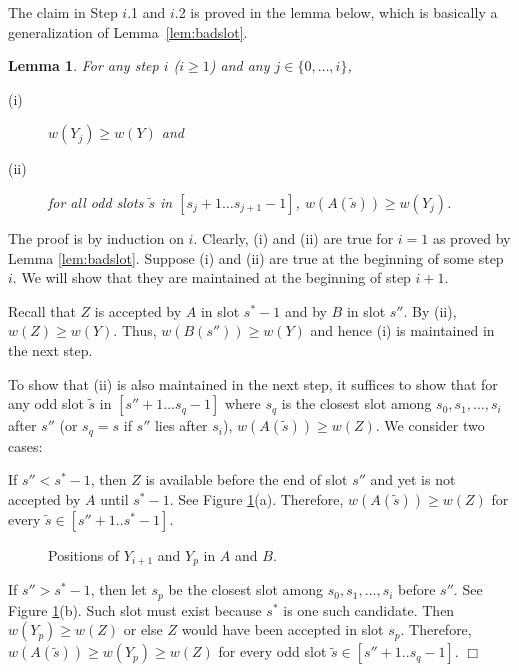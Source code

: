 \documentclass[11pt]{article}
\newtheorem{lemma}{Lemma}[section]
\newcommand{\qed}{\hspace*{\fill}$\Box$\par\medskip}
\newenvironment{proof}{\noindent{\it Proof. }\ignorespaces}{\qed}
\begin{document}
The claim in Step $i$.1 and $i$.2 is proved in the lemma below,
which is basically a generalization of Lemma~\ref{lem:badslot}.

\begin{lemma} \label{lem:A-weights}
For any step $i$ ($i \geq 1$) and any $j \in \{0, \ldots, i\}$, 
\begin{description}
\item[(i)]
$w(Y_j) \geq w(Y)$
and
\item[(ii)]
for all odd slots $\tilde{s}$ in $[s_j+1 \ldots s_{j+1}-1]$,
$w(A(\tilde{s})) \geq w(Y_j)$.
\end{description}
\end{lemma}

\begin{proof}
The proof is by induction on $i$.
Clearly, (i) and (ii) are true for $i=1$
as proved by Lemma \ref{lem:badslot}.
Suppose (i) and (ii) are true at the beginning
of some step $i$.
We will show that they are maintained
at the beginning of step $i+1$.

Recall that $Z$ is accepted by $A$ in slot
$s^*-1$ and by $B$ in slot $s''$.
By (ii), $w(Z) \geq w(Y)$.
Thus, $w(B(s'')) \geq w(Y)$ and hence
(i) is maintained in the next step.

To show that (ii) is also maintained in the next step,
it suffices to show that for any odd slot
$\tilde{s}$ in $[s''+1 \ldots s_q -1]$
where $s_q$ is the closest slot among
$s_0, s_1, \ldots, s_i$ after $s''$
(or $s_q = s$ if $s''$ lies after $s_i$), 
$w(A(\tilde{s})) \geq w(Z)$.
We consider two cases:

If $s'' < s^*-1$,
then $Z$ is available before the end of slot $s''$ and yet
is not accepted by $A$ until $s^*-1$.
See Figure \ref{fig:induction}(a).
Therefore, $w(A(\tilde{s})) \geq w(Z)$
for every $\tilde{s} \in [s''+1..s^*-1]$.

\begin{figure}[h]
\centerline{ \epsfysize=5cm  }
\caption{Positions of $Y_{i+1}$ and $Y_p$ in $A$ and $B$.}
\label{fig:induction}
\end{figure}

If $s'' > s^*-1$,
then let $s_p$ be the closest slot among
$s_0, s_1, \ldots, s_i$ before $s''$.
See Figure \ref{fig:induction}(b).
Such slot must exist because $s^*$ is
one such candidate.
Then $w(Y_p) \geq w(Z)$ or else $Z$ would
have been accepted in slot $s_p$.
Therefore, $w(A(\tilde{s})) \geq w(Y_p) \geq w(Z)$
for every odd slot $\tilde{s} \in [s''+1..s_q-1]$.  
\end{proof}
\end{document}
